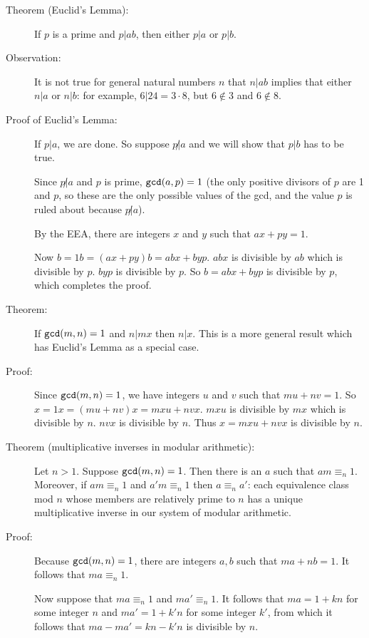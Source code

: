 \documentclass[12pt]{article}
\begin{document}
\begin{description}

\item[Theorem (Euclid's Lemma):]  If $p$ is a prime and $p|ab$, then either $p|a$ or $p|b$.

\item[Observation:]  It is not true for general natural numbers $n$ that $n|ab$ implies that either $n|a$ or $n|b$:
for example, $6|24 = 3 \cdot 8$, but $6 \not\in 3$ and $6 \not\in 8$.

\item [Proof of Euclid's Lemma:]  If $p|a$, we are done.  So suppose $p \not|a$ and we will show that $p|b$ has to be true.

Since $p \not| a$ and $p$ is prime, ${\tt gcd}(a,p) = 1$ (the only positive divisors of $p$ are 1 and $p$, so these are the only possible values of the gcd, and the value $p$ is ruled about because $p \not|a$).

By the EEA, there are integers $x$ and $y$ such that $ax+py = 1$.

Now $b = 1b = (ax+py)b = abx + byp$.  $abx$ is divisible by $ab$ which is divisible by $p$.  $byp$ is divisible by $p$.
So $b = abx + byp$ is divisible by $p$, which completes the proof.

\item[Theorem:]  If ${\tt gcd}(m,n) = 1$ and $n|mx$ then $n|x$.  This is a more general result which has Euclid's Lemma as a special case.

\item[Proof:]  Since ${\tt gcd}(m,n)=1$, we have integers $u$ and $v$ such that $mu+nv=1$.  So $x = 1x = (mu+nv)x = mxu + nvx$.  $mxu$ is divisible by $mx$ which is divisible by $n$.  $nvx$ is divisible by $n$.  Thus $x = mxu + nvx$ is divisible by $n$.

\item[Theorem (multiplicative inverses in modular arithmetic):]  Let $n>1$.  Suppose ${\tt gcd}(m,n)=1$.  Then there is an $a$ such that $am \equiv_n 1$.  Moreover, if $am \equiv_n 1$ and $a'm \equiv_n 1$ then $a \equiv_n a'$:  each equivalence class mod $n$ whose members are relatively prime to $n$ has a unique multiplicative inverse in our system of modular arithmetic.

\item[Proof:]   Because ${\tt gcd}(m,n) = 1$, there are integers $a, b$ such that $ma+nb=1$.  It follows that $ma \equiv_n 1$.

Now suppose that $ma \equiv_n 1$ and $ma' \equiv_n 1$.  It follows that $ma = 1 +kn$ for some integer $n$
and $ma' = 1+k'n$ for some integer $k'$, from which it follows that $ma-ma' = kn-k'n$ is divisible by $n$.


\end{description}
\end{document}
